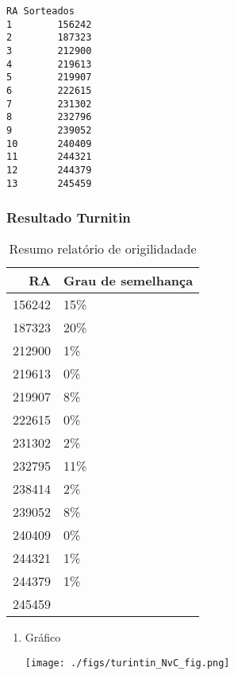 \documentclass[11pt]{article}
\begin{document}
\begin{verbatim}
RA Sorteados
1        156242
2        187323
3        212900
4        219613
5        219907
6        222615
7        231302
8        232796
9        239052
10       240409
11       244321
12       244379
13       245459
\end{verbatim}
\subsubsection{Resultado Turnitin}
\label{sec:orgdad0978}

\begin{table}[htbp]
\caption{\label{TurnitinNvC}Resumo relatório de origilidadade}
\centering
\begin{tabular}{rl}
\hline
RA & Grau de semelhança\\
\hline
156242 & 15\%\\
187323 & 20\%\\
212900 & 1\%\\
219613 & 0\%\\
219907 & 8\%\\
222615 & 0\%\\
231302 & 2\%\\
232795 & 11\%\\
238414 & 2\%\\
239052 & 8\%\\
240409 & 0\%\\
244321 & 1\%\\
244379 & 1\%\\
245459 & \\
\hline
\end{tabular}
\end{table}

\begin{enumerate}
\item Gráfico
\label{sec:org84adbc5}
\begin{center}
\texttt{[image: ./figs/turintin\_NvC\_fig.png]}
\end{center}
\end{enumerate}
\end{document}
